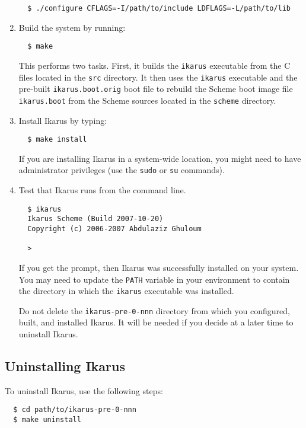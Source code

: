 \documentclass[onecolumn, 12pt, twoside, openright, dvipdfm]{book}
\begin{document}
\begin{enumerate}
\begin{verbatim}
  $ ./configure CFLAGS=-I/path/to/include LDFLAGS=-L/path/to/lib
\end{verbatim}

\item Build the system by running:
\begin{verbatim}
  $ make
\end{verbatim}
This performs two
tasks.  First, it builds the \texttt{ikarus} executable from the C
files located in the \texttt{src} directory.  It then uses the
\texttt{ikarus} executable and the pre-built
\texttt{ikarus.boot.orig} boot file to rebuild the Scheme boot image
file \texttt{ikarus.boot} from the Scheme sources located in the
\texttt{scheme} directory.

\item Install Ikarus by typing:
\begin{verbatim}
  $ make install
\end{verbatim}
If you are installing Ikarus in a system-wide location, you might
need to have administrator privileges (use the \texttt{sudo} or
\texttt{su} commands).

\item Test that Ikarus runs from the command line.
\begin{verbatim}
  $ ikarus
  Ikarus Scheme (Build 2007-10-20)
  Copyright (c) 2006-2007 Abdulaziz Ghuloum

  > 
\end{verbatim}
If you get the prompt, then Ikarus was successfully installed on
your system.  You may need to update the \texttt{PATH} variable in
your environment to contain the directory in which the
\texttt{ikarus} executable was installed.

Do not delete the \texttt{ikarus-pre-0-nnn} directory from which you
configured, built, and installed Ikarus.  It will be needed if you
decide at a later time to uninstall Ikarus.

\end{enumerate}

\subsection{Uninstalling Ikarus}

To uninstall Ikarus, use the following steps:

\begin{verbatim}
  $ cd path/to/ikarus-pre-0-nnn
  $ make uninstall
\end{verbatim}
\end{document}
